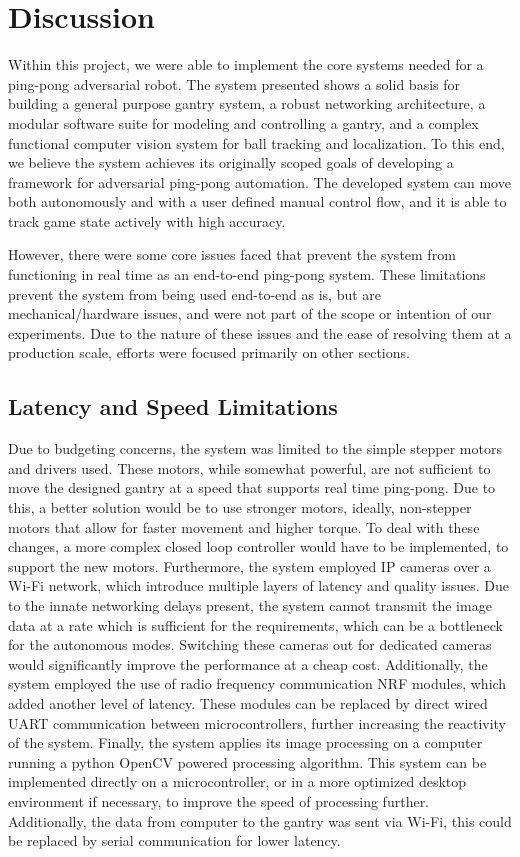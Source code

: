 \chapter{Discussion}
Within this project, we were able to implement the core systems needed for a ping-pong adversarial robot. The system presented shows a solid basis for building a general purpose gantry system, a robust networking architecture, a modular software suite for modeling and controlling a gantry, and a complex functional computer vision system for ball tracking and localization. To this end, we believe the system achieves its originally scoped goals of developing a framework for adversarial ping-pong automation. The developed system can move both autonomously and with a user defined manual control flow, and it is able to track game state actively with high accuracy.

 However, there were some core issues faced that prevent the system from functioning in real time as an end-to-end ping-pong system. These limitations prevent the system from being used end-to-end as is, but are mechanical/hardware issues, and were not part of the scope or intention of our experiments. Due to the nature of these issues and the ease of resolving them at a production scale, efforts were focused primarily on other sections.

\section{Latency and Speed Limitations}
Due to budgeting concerns, the system was limited to the simple stepper motors and drivers used. These motors, while somewhat powerful, are not sufficient to move the designed gantry at a speed that supports real time ping-pong. Due to this, a better solution would be to use stronger motors, ideally, non-stepper motors that allow for faster movement and higher torque. To deal with these changes, a more complex closed loop controller would have to be implemented, to support the new motors.
Furthermore, the system employed IP cameras over a Wi-Fi network, which introduce multiple layers of latency and quality issues. Due to the innate networking delays present, the system cannot transmit the image data at a rate which is sufficient for the requirements, which can be a bottleneck for the autonomous modes. Switching these cameras out for dedicated cameras would significantly improve the performance at a cheap cost.
Additionally, the system employed the use of radio frequency communication NRF modules, which added another level of latency. These modules can be replaced by direct wired UART communication between microcontrollers, further increasing the reactivity of the system.
Finally, the system applies its image processing on a computer running a python OpenCV powered processing algorithm. This system can be implemented directly on a microcontroller, or in a more optimized desktop environment if necessary, to improve the speed of processing further. Additionally, the data from computer to the gantry was sent via Wi-Fi, this could be replaced by serial communication for lower latency.

